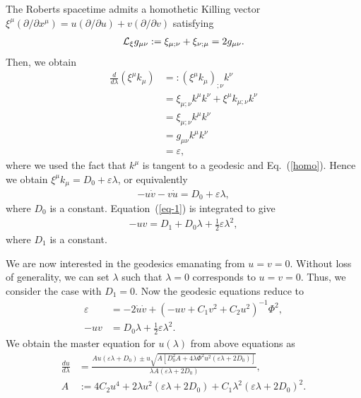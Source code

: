 \documentclass[aps,prd,twocolumn,eqsecnum,showpacs,amsmath]{revtex4}
\begin{document}
The Roberts spacetime admits a homothetic Killing vector $\xi^\mu(\partial/\partial x^\mu)=u(\partial/\partial u) +v(\partial/\partial v)$ satisfying 
\begin{align}
{\cal L}_{\xi}g_{\mu\nu}:=\xi_{\mu;\nu}+\xi_{\nu;\mu}=2g_{\mu\nu}.\label{homo}
\end{align}  
Then, we obtain
\begin{align}
\frac{d}{d\lambda}(\xi^\mu k_\mu)&=:(\xi^\mu k_\mu)_{;\nu}k^\nu \nonumber \\
&=\xi_{\mu;\nu}k^\mu k^\nu+\xi^\mu k_{\mu;\nu}k^\nu \nonumber \\ 
&=\xi_{\mu;\nu}k^\mu k^\nu \nonumber \\
&=g_{\mu\nu}k^\mu k^\nu \nonumber \\
&=\varepsilon,
\end{align}  
where we used the fact that $k^\mu$ is tangent to a geodesic and Eq.~(\ref{homo}).
Hence we obtain $\xi^\mu k_\mu=D_0+\varepsilon \lambda$, or equivalently 
\begin{align}
-u{\dot v}-v{\dot u}=D_0+\varepsilon \lambda, \label{eq-1}
\end{align}  
where $D_0$ is a constant.
Equation~(\ref{eq-1}) is integrated to give
\begin{align}
-uv=D_1+D_0\lambda+\frac12 \varepsilon \lambda^2,
\end{align}  
where $D_1$ is a constant.

We are now interested in the geodesics emanating from $u=v=0$.
Without loss of generality, we can set $\lambda$ such that $\lambda=0$ corresponds to $u=v=0$.
Thus, we consider the case with $D_1=0$.
Now the geodesic equations reduce to
\begin{align}
\varepsilon&=-2{\dot u}{\dot v}+(-uv+C_1v^2+C_2u^2)^{-1}\Phi^2, \label{key2} \\
-uv&=D_0\lambda+\frac12 \varepsilon \lambda^2. \label{key1}
\end{align}  
We obtain the master equation for $u(\lambda)$ from above equations  as
\begin{align}
\frac{du}{d\lambda}&=\frac{Au(\varepsilon \lambda+D_0)\pm u\sqrt{A[D_0^2A+4\lambda\Phi^2u^2(\varepsilon \lambda+2D_0)]}}{\lambda A(\varepsilon \lambda+2D_0)},\label{master} \\
A&:=4C_2 u^4+2\lambda u^2(\varepsilon \lambda+2D_0)+C_1\lambda^2(\varepsilon \lambda+2D_0)^2.
\end{align}  
\end{document}
